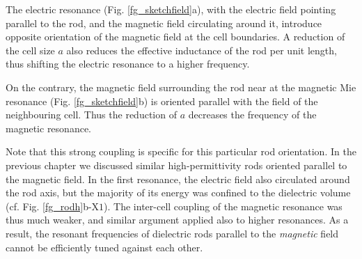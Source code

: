 The electric resonance (Fig. \ref{fg_sketchfield}a), with the electric field pointing parallel to the rod, and the magnetic field circulating around it, introduce opposite orientation of the magnetic field at the cell boundaries. A reduction of the cell size $a$ also reduces the effective inductance of the rod per unit length, thus shifting the electric resonance to a higher frequency.

On the contrary, the magnetic field surrounding the rod near at the magnetic Mie resonance (Fig. \ref{fg_sketchfield}b) is oriented parallel with the field of the neighbouring cell. Thus the reduction of $a$ decreases the frequency of the magnetic resonance.

Note that this strong coupling is specific for this particular rod orientation. In the previous chapter we discussed similar high-permittivity rods oriented parallel to the magnetic field. In the first resonance, the electric field also circulated around the rod axis, but the majority of its energy was confined to the dielectric volume (cf. Fig.  \ref{fg_rodh}b-$\text{X}1$).  The inter-cell coupling of the magnetic resonance was thus much weaker, and similar argument applied also to higher resonances. As a result, the resonant frequencies of dielectric rods parallel to the \textit{magnetic} field cannot be efficiently tuned against each other.

